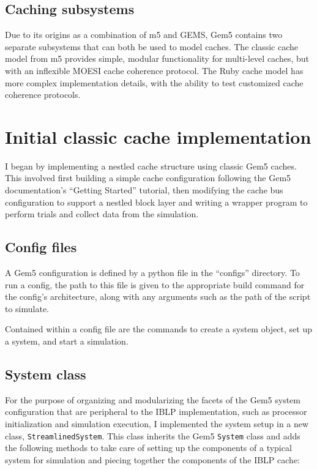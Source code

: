 \documentclass[12pt,twoside]{reedthesis}
\begin{document}
	\subsection*{Caching subsystems}

	Due to its origins as a combination of m5 and GEMS, Gem5 contains two separate subsystems that can both be used to model caches. The classic cache model from m5 provides simple, modular functionality for multi-level caches, but with an inflexible MOESI cache coherence protocol. The Ruby cache model has more complex implementation details, with the ability to test customized cache coherence protocols.

\section{Initial classic cache implementation}

	I began by implementing a nestled cache structure using classic Gem5 caches. This involved first building a simple cache configuration following the Gem5 documentation's ``Getting Started'' tutorial, then modifying the cache bus configuration to support a nestled block layer and writing a wrapper program to perform trials and collect data from the simulation.

	\subsection*{Config files}

	A Gem5 configuration is defined by a python file in the ``configs'' directory. To run a config, the path to this file is given to the appropriate build command for the config's architecture, along with any arguments such as the path of the script to simulate.
	
	Contained within a config file are the commands to create a system object, set up a system, and start a simulation.

	\subsection*{System class}

	For the purpose of organizing and modularizing the facets of the Gem5 system configuration that are peripheral to the IBLP implementation, such as processor initialization and simulation execution, I implemented the system setup in a new class, \verb`StreamlinedSystem`. This class inherits the Gem5 \verb`System` class and adds the following methods to take care of setting up the components of a typical system for simulation and piecing together the components of the IBLP cache:
\end{document}
